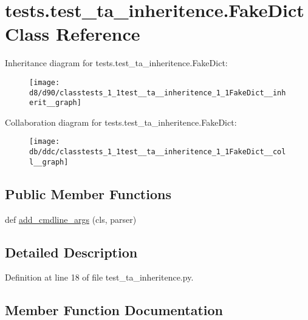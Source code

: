 \hypertarget{classtests_1_1test__ta__inheritence_1_1FakeDict}{}\section{tests.\+test\+\_\+ta\+\_\+inheritence.\+Fake\+Dict Class Reference}
\label{classtests_1_1test__ta__inheritence_1_1FakeDict}


Inheritance diagram for tests.\+test\+\_\+ta\+\_\+inheritence.\+Fake\+Dict\+:\nopagebreak
\begin{figure}[H]
\begin{center}
\leavevmode
\texttt{[image: d8/d90/classtests\_1\_1test\_\_ta\_\_inheritence\_1\_1FakeDict\_\_inherit\_\_graph]}
\end{center}
\end{figure}


Collaboration diagram for tests.\+test\+\_\+ta\+\_\+inheritence.\+Fake\+Dict\+:\nopagebreak
\begin{figure}[H]
\begin{center}
\leavevmode
\texttt{[image: db/ddc/classtests\_1\_1test\_\_ta\_\_inheritence\_1\_1FakeDict\_\_coll\_\_graph]}
\end{center}
\end{figure}
\subsection*{Public Member Functions}
\begin{DoxyCompactItemize}
\item 
def \hyperlink{classtests_1_1test__ta__inheritence_1_1FakeDict_a75f0777e5a33a01975af1f8d40b79faa}{add\+\_\+cmdline\+\_\+args} (cls, parser)
\end{DoxyCompactItemize}


\subsection{Detailed Description}


Definition at line 18 of file test\+\_\+ta\+\_\+inheritence.\+py.



\subsection{Member Function Documentation}
\mbox{\label{classtests_1_1test__ta__inheritence_1_1FakeDict_a75f0777e5a33a01975af1f8d40b79faa}} 
